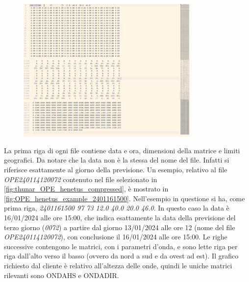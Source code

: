 \documentclass[./main.tex]{subfiles}
\begin{document}
\begin{figure}[!ht]
\noindent \begin{minipage}{\textwidth}
\vspace{1cm}
\centering
\includegraphics[width=0.8\textwidth]{images/OPE_henetus_example_2401161500.pdf}
\captionsetup{font=small, hypcap=false}
\label{fig:OPE_henetus_example_2401161500}
\end{minipage}
\vspace{0.25cm}
\end{figure}

La prima riga di ogni file contiene data e ora, dimensioni della matrice e limiti geografici. Da notare che la data non è la stessa del nome del file. Infatti si riferisce esattamente al giorno della previsione. Un esempio, relativo al file \textit{OPE240114120072} contenuto nel file selezionato in \autoref{fig:thunar_OPE_henetus_compressed}, è mostrato in \autoref{fig:OPE_henetus_example_2401161500}.  Nell'esempio in questione si ha, come prima riga, \textit{2401161500        97        73  12.0  40.0  20.0  46.0}. In questo caso la data è 16/01/2024 alle ore 15:00, che indica esattamente la data della previsione del terzo giorno (\textit{0072}) a partire dal giorno 13/01/2024 alle ore 12 (nome del file \textit{OPE240114120072}), con conclusione il 16/01/2024 alle ore 15:00. Le righe successive contengono le matrici, con i parametri d'onda, e sono lette riga per riga dall'alto verso il basso (ovvero da nord a sud e da ovest ad est). Il grafico richiesto dal cliente è relativo all'altezza delle onde, quindi le uniche matrici rilevanti sono ONDAHS e ONDADIR.\par
\end{document}
